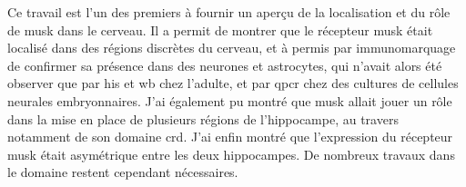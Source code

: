 Ce travail est l'un des premiers à fournir un aperçu de la localisation et du rôle de \gls{musk} dans le cerveau. Il a permit de montrer que le récepteur \gls{musk} était localisé dans des régions discrètes du cerveau, et à permis par immunomarquage de confirmer sa présence dans des neurones et astrocytes, qui n'avait alors été observer que par \gls{his} et \gls{wb} chez l'adulte, et par \gls{qpcr} chez des cultures de cellules neurales embryonnaires. J'ai également pu montré que \gls{musk} allait jouer un rôle dans la mise en place de  plusieurs régions de l'hippocampe, au travers notamment de son domaine \gls{crd}. J'ai enfin montré que l'expression du récepteur \gls{musk} était asymétrique entre les deux hippocampes. De nombreux travaux dans le domaine restent cependant nécessaires.